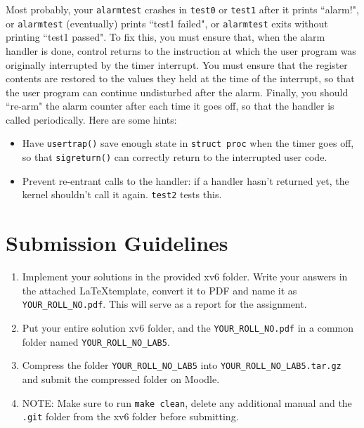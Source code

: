 \documentclass[11pt]{exam}
\begin{document}
\begin{questions}
Most probably, your {\tt alarmtest} crashes in {\tt test0} or {\tt test1} after it prints ``alarm!", or {\tt alarmtest} (eventually) prints ``test1 failed", or {\tt alarmtest} exits without printing ``test1 passed". To fix this, you must ensure that, when the alarm handler is done, control returns to the instruction at which the user program was originally interrupted by the timer interrupt. You must ensure that the register contents are restored to the values they held at the time of the interrupt, so that the user program can continue undisturbed after the alarm. Finally, you should ``re-arm" the alarm counter after each time it goes off, so that the handler is called periodically. Here are some hints:

\begin{itemize}
    \item Have \texttt{usertrap()} save enough state in {\tt struct proc} when the timer goes off, so that \texttt{sigreturn()} can correctly return to the interrupted user code.
    \item Prevent re-entrant calls to the handler: if a handler hasn't returned yet, the kernel shouldn't call it again. {\tt test2} tests this. 
\end{itemize}
    
\end{questions}


\section*{Submission Guidelines}  
\begin{enumerate}
    \item Implement your solutions in the provided xv6 folder. Write your answers in the attached \LaTeX template, convert it to PDF and name it as \texttt{YOUR\_ROLL\_NO.pdf}. This will serve as a report for the assignment.
    \item Put your entire solution xv6 folder, and the \texttt{YOUR\_ROLL\_NO.pdf} in a common folder named \texttt{YOUR\_ROLL\_NO\_LAB5}. 
    \item Compress the folder \texttt{YOUR\_ROLL\_NO\_LAB5} into \texttt{YOUR\_ROLL\_NO\_LAB5.tar.gz} and submit the compressed folder on Moodle.
    \item NOTE: Make sure to run \texttt{make clean}, delete any additional manual and the \texttt{.git} folder from the xv6 folder before submitting.
\end{enumerate}
\end{document}
